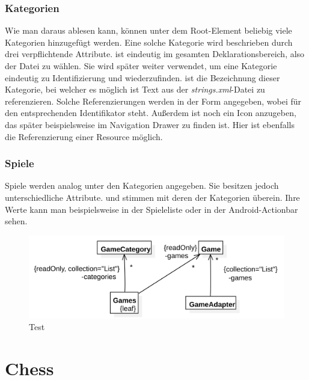\subsubsection{Kategorien}

Wie man daraus ablesen kann, können unter dem Root-Element  beliebig
viele Kategorien hinzugefügt werden. Eine solche Kategorie wird beschrieben
durch drei verpflichtende Attribute.  ist eindeutig im gesamten
Deklarationsbereich, also der Datei zu wählen. Sie wird später weiter verwendet,
um eine Kategorie eindeutig zu Identifizierung und wiederzufinden.  
ist die Bezeichnung dieser Kategorie, bei welcher es möglich ist Text aus der
\emph{strings.xml}-Datei zu referenzieren. Solche Referenzierungen werden in der
Form  angegeben, wobei  für den entsprechenden
Identifikator steht. Außerdem ist noch ein Icon anzugeben, das später
beispielsweise im Navigation Drawer zu finden ist. Hier ist ebenfalls die
Referenzierung einer Resource möglich.

\subsubsection{Spiele}

Spiele werden analog unter den Kategorien angegeben. Sie besitzen jedoch
unterschiedliche Attribute.  und  stimmen mit deren der
Kategorien überein. Ihre Werte kann man beispielsweise in der Spieleliste oder
in der Android-Actionbar sehen. 

\begin{figure}[h]
	\centering
	\includegraphics{resources/gamemanager/gamemanager_uml}
	\caption{Test}
	\label{fig:gm_uml}
\end{figure}

\section{Chess}
\sectionauthor{\oliver}

